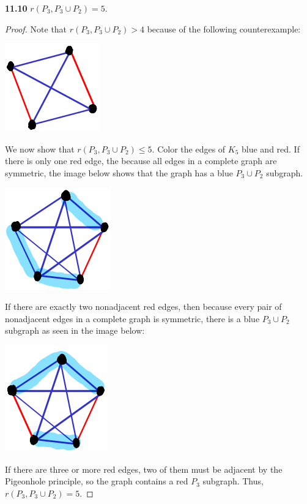 \documentclass[12pt]{article}
\begin{document}
\newpage\noindent\textbf{11.10} $r(P_3, P_3 \cup P_2) = 5$.
\begin{proof}
    Note that $r(P_3, P_3 \cup P_2) > 4$ because of the following counterexample:

    \begin{center} \includegraphics{5.png} \end{center}

    We now show that $r(P_3, P_3 \cup P_2) \leq 5$.
    Color the edges of $K_5$ blue and red.
    If there is only one red edge, the because all edges in a complete graph are symmetric, the image below shows that the graph has a blue $P_3\cup P_2$ subgraph.
    \begin{center} \includegraphics{6.png} \end{center}
    If there are exactly two nonadjacent red edges, then because every pair of nonadjacent edges in a complete graph is symmetric, there is a blue $P_3\cup P_2$ subgraph as seen in the image below:
    \begin{center} \includegraphics{7.png} \end{center}
    If there are three or more red edges, two of them must be adjacent by the Pigeonhole principle, so the graph contains a red $P_3$ subgraph.
    Thus, $r(P_3, P_3 \cup P_2) = 5$.
\end{proof}
\end{document}

